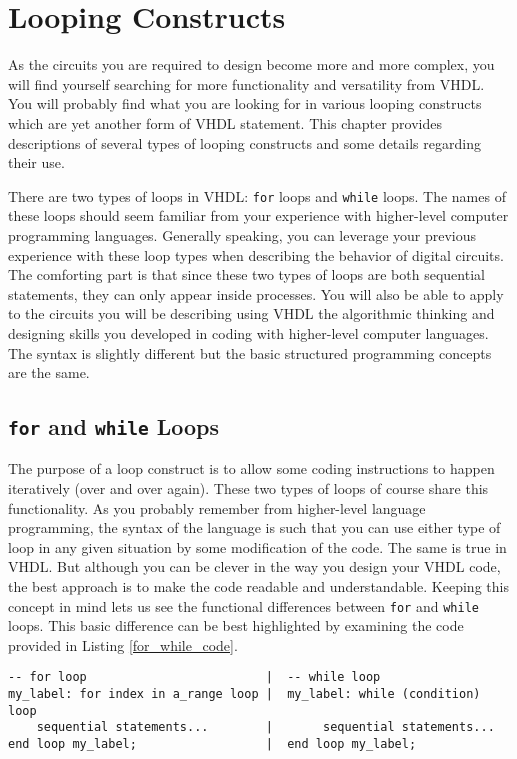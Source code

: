 %
%
\chapter{Looping Constructs}
As the circuits you are required to design become more and more complex, you will find yourself searching for more functionality and versatility from VHDL. You will probably find what you are looking for in various looping constructs which are yet another form of VHDL statement. This chapter provides descriptions of several types of looping constructs and some details regarding their use. 

There are two types of loops in VHDL: \texttt{for} loops and \texttt{while} loops. The names of these loops should seem familiar from your experience with higher-level computer programming languages. Generally speaking, you can leverage your previous experience with these loop types when describing the behavior of digital circuits. The comforting part is that since these two types of loops are both sequential statements, they can only appear inside processes. You will also be able to apply to the circuits you will be describing using VHDL the algorithmic thinking and designing skills you developed in coding with higher-level computer languages. The syntax is slightly different but the basic structured programming concepts are the same. 

\section{\texttt{for} and \texttt{while} Loops}
The purpose of a loop construct is to allow some coding instructions to happen iteratively (over and over again). These two types of loops of course share this functionality. As you probably remember from higher-level language programming, the syntax of the language is such that you can use either type of loop in any given situation by some modification of the code. The same is true in VHDL. But although you can be clever in the way you design your VHDL code, the best approach is to make the code readable and understandable. Keeping this concept in mind lets us see the functional differences between \texttt{for} and \texttt{while} loops. This basic difference can be best highlighted by examining the code provided in Listing \ref{for_while_code}.

\noindent
\begin{minipage}{0.99\linewidth}
\begin{lstlisting}[label=for_while_code, caption=The basic structure of the \texttt{for} and \texttt{while} loops.]
-- for loop							|  -- while loop
my_label: for index in a_range loop	|  my_label: while (condition) loop
	sequential statements...		|       sequential statements...
end loop my_label;					|  end loop my_label;
\end{lstlisting}
\end{minipage}

